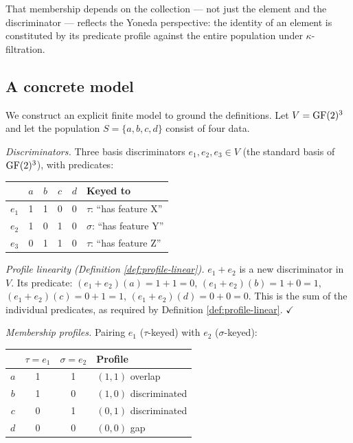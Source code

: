 \begin{remark}
That membership depends on the collection --- not just the element
and the discriminator --- reflects the Yoneda perspective: the
identity of an element is constituted by its predicate profile
against the entire population under $\kappa$-filtration.
\end{remark}


\subsection{A concrete model}\label{sec:concrete-model}

We construct an explicit finite model to ground the
definitions. Let $V = \operatorname{GF}(2)^3$ and let the population
$S = \{a, b, c, d\}$ consist of four data.

\emph{Discriminators.}
Three basis discriminators $e_1, e_2, e_3 \in V$
(the standard basis of $\operatorname{GF}(2)^3$), with predicates:

\begin{center}
\small
\begin{tabular}{c|cccc|l}
& $a$ & $b$ & $c$ & $d$ & Keyed to \\
\hline
$e_1$ & 1 & 1 & 0 & 0 & $\tau$: ``has feature X'' \\
$e_2$ & 1 & 0 & 1 & 0 & $\sigma$: ``has feature Y'' \\
$e_3$ & 0 & 1 & 1 & 0 & $\tau$: ``has feature Z''
\end{tabular}
\end{center}

\emph{Profile linearity (Definition \ref{def:profile-linear}).} $e_1 + e_2$ is a new
discriminator in $V$. Its predicate:
$(e_1 + e_2)(a) = 1 + 1 = 0$,
$(e_1 + e_2)(b) = 1 + 0 = 1$,
$(e_1 + e_2)(c) = 0 + 1 = 1$,
$(e_1 + e_2)(d) = 0 + 0 = 0$.
This is the sum of the individual predicates, as required
by Definition \ref{def:profile-linear}. $\checkmark$

\emph{Membership profiles.}
Pairing $e_1$ ($\tau$-keyed) with $e_2$ ($\sigma$-keyed):
\begin{center}
\begin{tabular}{c|cc|l}
& $\tau = e_1$ & $\sigma = e_2$ & Profile \\
\hline
$a$ & 1 & 1 & $(1,1)$ overlap \\
$b$ & 1 & 0 & $(1,0)$ discriminated \\
$c$ & 0 & 1 & $(0,1)$ discriminated \\
$d$ & 0 & 0 & $(0,0)$ gap
\end{tabular}
\end{center}

